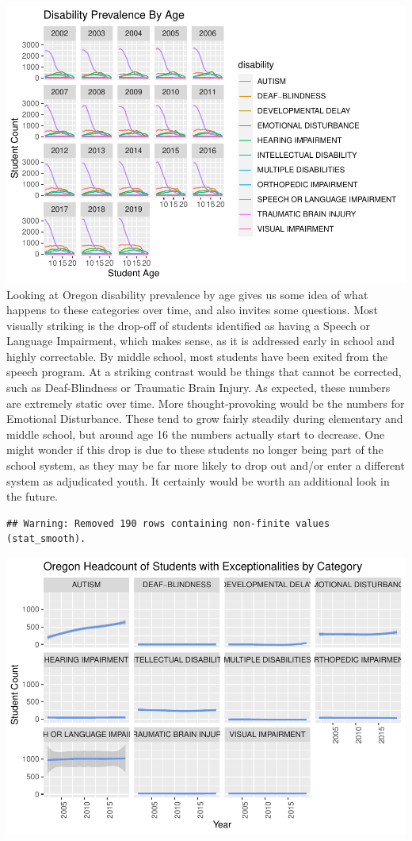 \documentclass[
  english,
  man]{apa6}
\begin{document}
\includegraphics{Final_project_files/figure-latex/Oregon plot-1.pdf}
Looking at Oregon disability prevalence by age gives us some idea of what happens to these categories over time, and also invites some questions. Most visually striking is the drop-off of students identified as having a Speech or Language Impairment, which makes sense, as it is addressed early in school and highly correctable. By middle school, most students have been exited from the speech program. At a striking contrast would be things that cannot be corrected, such as Deaf-Blindness or Traumatic Brain Injury. As expected, these numbers are extremely static over time. More thought-provoking would be the numbers for Emotional Disturbance. These tend to grow fairly steadily during elementary and middle school, but around age 16 the numbers actually start to decrease. One might wonder if this drop is due to these students no longer being part of the school system, as they may be far more likely to drop out and/or enter a different system as adjudicated youth. It certainly would be worth an additional look in the future.

\begin{verbatim}
## Warning: Removed 190 rows containing non-finite values (stat_smooth).
\end{verbatim}

\includegraphics{Final_project_files/figure-latex/unnamed-chunk-1-1.pdf}
\end{document}

